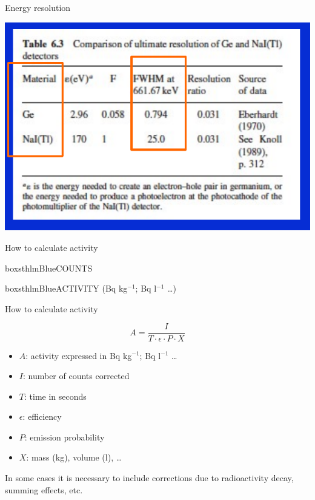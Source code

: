 \begin{frame}{Energy resolution}

\centering
\includegraphics[scale=0.4]{figures/comparisonresolution.png}

\end{frame}

\begin{frame}{How to calculate activity}

\begin{beamercolorbox}[wd=\linewidth,ht=3ex,dp=3ex]{boxsthlmBlue}\centering COUNTS\end{beamercolorbox}



\centering \arrowdown

\begin{beamercolorbox}[wd=\linewidth,ht=3ex,dp=3ex]{boxsthlmBlue}\centering ACTIVITY (Bq kg$^{-1}$; Bq l$^{-1}$ \ldots)\end{beamercolorbox}


\end{frame}


\begin{frame}{How to calculate activity}


\centering 
\[A = \frac{I}{T\cdot \epsilon \cdot P \cdot X}\]



\begin{itemize}
\item $A$: activity expressed in Bq kg$^{-1}$; Bq l$^{-1}$ \ldots
\item $I$: number of counts corrected
\item $T$: time in seconds
\item $\epsilon$: efficiency
\item $P$: emission probability
\item $X$: mass (kg), volume (l), \ldots
\end{itemize}

In some cases it is necessary to include corrections due to radioactivity decay, summing effects, etc.



\end{frame}

